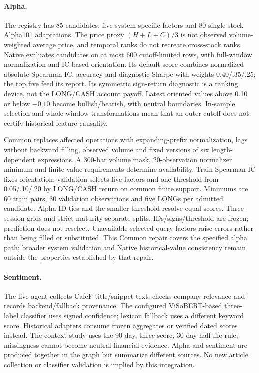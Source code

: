 \paragraph{Alpha.}
The registry has 85 candidates: five system-specific factors and 80
single-stock Alpha101 adaptations. The price proxy $(H+L+C)/3$ is not
observed volume-weighted average price, and temporal ranks do not recreate cross-stock ranks.
\autocite{kakushadze2016formulaic} Native evaluates candidates on at most
600 cutoff-limited rows, with full-window normalization and IC-based
orientation. Its default score combines normalized absolute Spearman IC,
accuracy and diagnostic Sharpe with weights 0.40/.35/.25; the top five
feed its report. Its symmetric sign-return diagnostic is a ranking
device, not the LONG/CASH account payoff. Latest oriented values above
0.10 or below $-0.10$ become bullish/bearish, with neutral boundaries.
In-sample selection and whole-window transformations mean that an outer
cutoff does not certify historical feature causality.

Common replaces affected operations with expanding-prefix normalization,
lags without backward filling, observed volume and fixed versions of six
length-dependent expressions. A 300-bar volume mask, 20-observation
normalizer minimum and finite-value requirements determine availability.
Train Spearman IC fixes orientation; validation selects five factors and
one threshold from 0.05/.10/.20 by LONG/CASH return on common finite
support. Minimums are 60 train pairs, 30 validation observations and five
LONGs per admitted candidate. Alpha-ID ties and the smaller threshold
resolve equal scores. Three-session grids and strict maturity separate
splits. IDs/signs/threshold are frozen; prediction does not reselect.
Unavailable selected query factors raise errors rather than being filled
or substituted. This Common repair covers the specified alpha path;
broader system validation and Native historical-value consistency remain
outside the properties established by that repair.

\paragraph{Sentiment.}
The live agent collects CafeF title/snippet text, checks company relevance
and records backend/fallback provenance. The configured ViSoBERT-based
three-label classifier uses signed confidence; lexicon fallback uses a
different keyword score. Historical adapters consume frozen aggregates
or verified dated scores instead. The context study uses the 90-day,
three-score, 30-day-half-life rule; missingness cannot become neutral
financial evidence. Alpha and sentiment are produced together in the
graph but summarize different sources. No new article collection or
classifier validation is implied by this integration.

